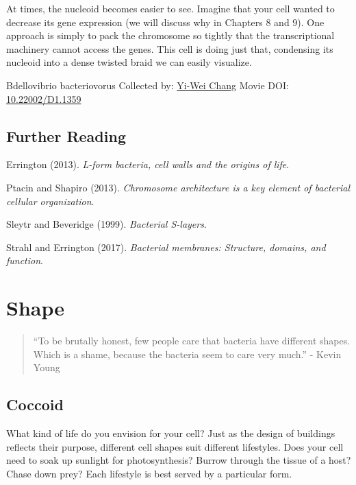 \documentclass[]{tufte-book}
\begin{document}
At times, the nucleoid becomes easier to see. Imagine that your cell wanted to decrease its gene expression (we will discuss why in Chapters 8 and 9). One approach is simply to pack the chromosome so tightly that the transcriptional machinery cannot access the genes. This cell is doing just that, condensing its nucleoid into a dense twisted braid we can easily visualize.



\hypertarget{htmlwidget-291e8a8a3041bfaa2999}{}

\label{fig:2-10}Bdellovibrio bacteriovorus Collected by: \protect\hyperlink{yi-wei_chang}{Yi-Wei Chang} Movie DOI: \href{https://doi.org/10.22002/D1.1359}{10.22002/D1.1359}

\hypertarget{further-reading-1}{%
\section{Further Reading}\label{further-reading-1}}

Errington (2013). \emph{L-form bacteria, cell walls and the origins of life}.\citep{errington2013}

Ptacin and Shapiro (2013). \emph{Chromosome architecture is a key element of bacterial cellular organization}.\citep{ptacin2013}

Sleytr and Beveridge (1999). \emph{Bacterial S-layers}.\citep{sleytr1999}

Strahl and Errington (2017). \emph{Bacterial membranes: Structure, domains, and function}.\citep{strahl2017}

\hypertarget{shape}{%
\chapter{Shape}\label{shape}}

\begin{quote}
``To be brutally honest, few people care that bacteria have different shapes. Which is a shame, because the bacteria seem to care very much.''
- Kevin Young \citep{young2006}
\end{quote}

\hypertarget{coccoid}{%
\section{Coccoid}\label{coccoid}}

What kind of life do you envision for your cell? Just as the design of buildings reflects their purpose, different cell shapes suit different lifestyles. Does your cell need to soak up sunlight for photosynthesis? Burrow through the tissue of a host? Chase down prey? Each lifestyle is best served by a particular form.
\end{document}
